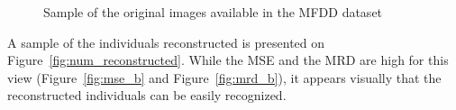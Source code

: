 \begin{figure}[h]
    \caption{Sample of the original images available in the MFDD dataset}
\label{fig:num_original}
\end{figure}

A sample of the individuals reconstructed is presented on Figure~\ref{fig:num_reconstructed}. While the MSE and the MRD are high for this view (Figure~\ref{fig:mse_b} and Figure~\ref{fig:mrd_b}), it appears visually that the reconstructed individuals can be easily recognized.

